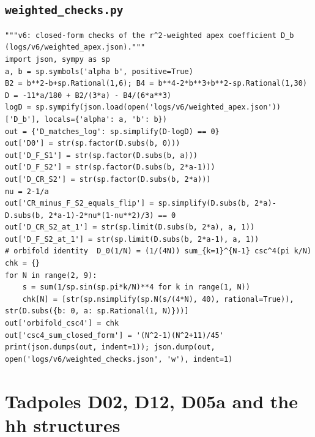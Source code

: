 \documentclass[10pt]{article}
\begin{document}
\subsection{\texttt{weighted\_checks.py}}
\begin{lstlisting}
"""v6: closed-form checks of the r^2-weighted apex coefficient D_b (logs/v6/weighted_apex.json)."""
import json, sympy as sp
a, b = sp.symbols('alpha b', positive=True)
B2 = b**2-b+sp.Rational(1,6); B4 = b**4-2*b**3+b**2-sp.Rational(1,30)
D = -11*a/180 + B2/(3*a) - B4/(6*a**3)
logD = sp.sympify(json.load(open('logs/v6/weighted_apex.json'))['D_b'], locals={'alpha': a, 'b': b})
out = {'D_matches_log': sp.simplify(D-logD) == 0}
out['D0'] = str(sp.factor(D.subs(b, 0)))
out['D_F_S1'] = str(sp.factor(D.subs(b, a)))
out['D_F_S2'] = str(sp.factor(D.subs(b, 2*a-1)))
out['D_CR_S2'] = str(sp.factor(D.subs(b, 2*a)))
nu = 2-1/a
out['CR_minus_F_S2_equals_flip'] = sp.simplify(D.subs(b, 2*a)-D.subs(b, 2*a-1)-2*nu*(1-nu**2)/3) == 0
out['D_CR_S2_at_1'] = str(sp.limit(D.subs(b, 2*a), a, 1))
out['D_F_S2_at_1'] = str(sp.limit(D.subs(b, 2*a-1), a, 1))
# orbifold identity  D_0(1/N) = (1/(4N)) sum_{k=1}^{N-1} csc^4(pi k/N)
chk = {}
for N in range(2, 9):
    s = sum(1/sp.sin(sp.pi*k/N)**4 for k in range(1, N))
    chk[N] = [str(sp.nsimplify(sp.N(s/(4*N), 40), rational=True)), str(D.subs({b: 0, a: sp.Rational(1, N)}))]
out['orbifold_csc4'] = chk
out['csc4_sum_closed_form'] = '(N^2-1)(N^2+11)/45'
print(json.dumps(out, indent=1)); json.dump(out, open('logs/v6/weighted_checks.json', 'w'), indent=1)
\end{lstlisting}
\section{Tadpoles D02, D12, D05a and the hh structures}
\end{document}
